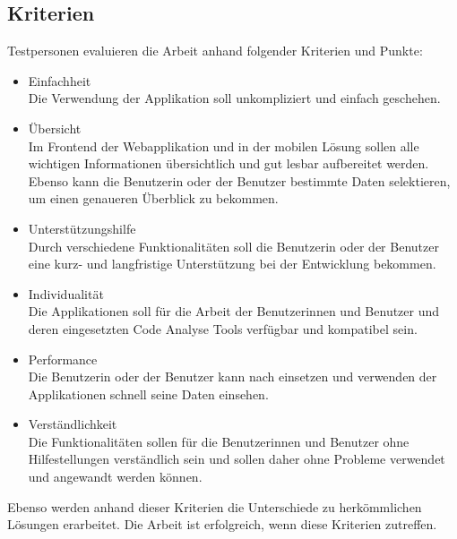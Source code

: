 \subsection{Kriterien} 
Testpersonen evaluieren die Arbeit anhand folgender Kriterien und Punkte:
\begin{itemize}
\item Einfachheit \\ Die Verwendung der Applikation soll unkompliziert und einfach geschehen. 
\item Übersicht \\ Im Frontend der Webapplikation und in der mobilen Lösung sollen alle wichtigen Informationen übersichtlich und gut lesbar aufbereitet werden. Ebenso kann die Benutzerin oder der Benutzer bestimmte Daten selektieren, um einen genaueren Überblick zu bekommen.
\item Unterstützungshilfe \\ Durch verschiedene Funktionalitäten soll die Benutzerin oder der Benutzer eine kurz- und langfristige Unterstützung bei der Entwicklung bekommen.
\item Individualität \\ Die Applikationen soll für die Arbeit der Benutzerinnen und Benutzer und deren eingesetzten Code Analyse Tools verfügbar und kompatibel sein. 
\item Performance \\ Die Benutzerin oder der Benutzer kann nach einsetzen und verwenden der Applikationen schnell seine Daten einsehen.
\item Verständlichkeit \\ Die Funktionalitäten sollen für die Benutzerinnen und Benutzer ohne Hilfestellungen verständlich sein und sollen daher ohne Probleme verwendet und angewandt werden können.
\end{itemize}

Ebenso werden anhand dieser Kriterien die Unterschiede zu herkömmlichen Lösungen erarbeitet. Die Arbeit ist erfolgreich, wenn diese Kriterien zutreffen. 

